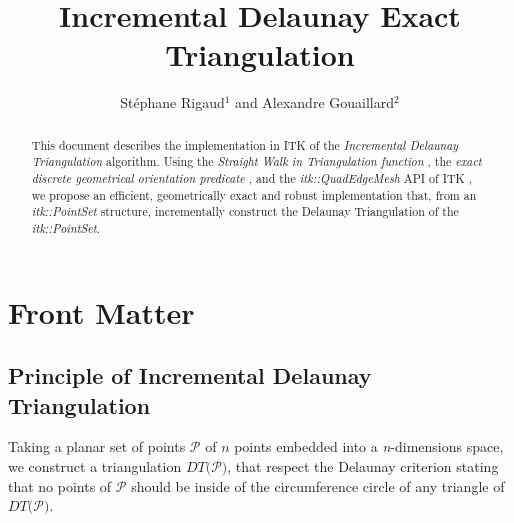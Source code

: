 \documentclass{InsightArticle}
\title{Incremental Delaunay Exact Triangulation}
\author{St\'{e}phane Rigaud$^{1}$ and Alexandre Gouaillard$^{2}$}
\newcommand{\IJhandlerIDnumber}{1338}  %
\begin{document}
%
% 
\IJhandlefooter{\IJhandlerIDnumber}


\ifpdf
\else
\fi


\maketitle


\ifhtml
\chapter*{Front Matter\label{front}}
\fi


\begin{abstract}
\noindent
This document describes the implementation in ITK of the \emph{Incremental Delaunay Triangulation} algorithm. Using the \emph{Straight Walk in Triangulation function} \cite{Rigaud2012}, the \emph{exact discrete geometrical orientation predicate} \cite{Moreau2011},  and the \emph{itk::QuadEdgeMesh} API \cite{Gouaillard2006} of ITK , we propose an efficient, geometrically exact and robust implementation that, from an \emph{itk::PointSet} structure, incrementally construct the Delaunay Triangulation of the \emph{itk::PointSet}.

\end{abstract}

\IJhandlenote{\IJhandlerIDnumber}

\tableofcontents
\vfil
\section{Principle of Incremental Delaunay Triangulation}

Taking a planar set of points $\mathcal{P}$ of $\mathit{n}$ points embedded into a \emph{n}-dimensions space, we construct a triangulation $\mathit{DT(}\mathcal{P}\mathit{)}$, that respect the Delaunay criterion stating that no points of $\mathcal{P}$ should be inside of the circumference circle of any triangle of $\mathit{DT(}\mathcal{P}\mathit{)}$.\\
\end{document}
